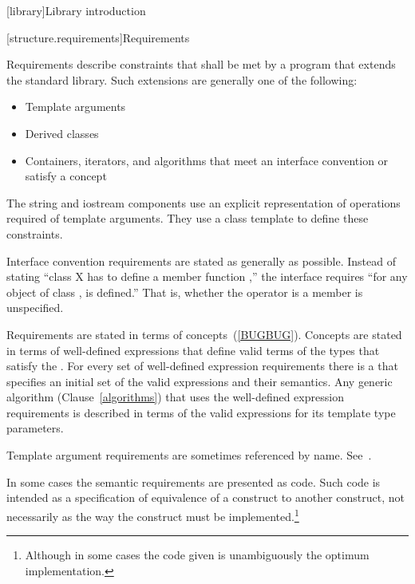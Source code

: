 \setcounter{chapter}{16}
[library]{Library introduction}

\setcounter{section}{5}
\setcounter{subsection}{1}
\setcounter{subsubsection}{2}

[structure.requirements]{Requirements}

\pnum
{}%
Requirements describe constraints that shall be met by a \Cpp program that extends the standard library.
Such extensions are generally one of the following:

\begin{itemize}
\item Template arguments
\item Derived classes
\item Containers, iterators, and algorithms that meet an interface convention
or satisfy a concept
\end{itemize}

\pnum
The string and iostream components use an explicit representation of operations
required of template arguments. They use a class template  to
define these constraints.

\pnum
Interface convention requirements are stated as generally as possible. Instead
of stating ``class X has to define a member function ,'' the
interface requires ``for any object  of class ,  is
defined.'' That is, whether the operator is a member is unspecified.

\pnum
Requirements are stated in terms of concepts~(\ref{BUGBUG}).
Concepts are stated in terms of well-defined expressions that define valid terms of
the types that satisfy the . For every set of
well-defined expression requirements there is a  that
specifies an initial set of the valid expressions and their semantics. Any generic
algorithm (Clause~\ref{algorithms}) that uses the well-defined expression requirements
is described in terms of the valid expressions for its template type parameters.

\pnum
Template argument requirements are sometimes referenced by name.
See~.

\pnum
In some cases the semantic requirements are presented as \Cpp code.
Such code is intended as a
specification of equivalence of a construct to another construct, not
necessarily as the way the construct
must be implemented.\footnote{Although in some cases the code given is
unambiguously the optimum implementation.}

